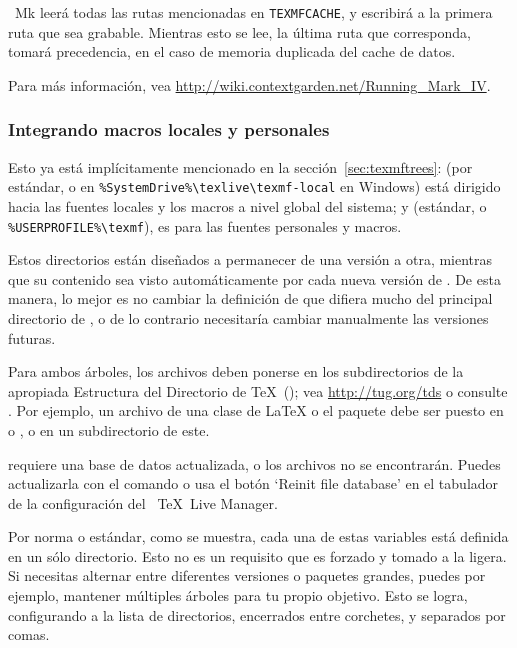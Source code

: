 \documentclass{article}
\begin{document}
\ConTeXt\ Mk leerá todas las rutas mencionadas en
\verb+TEXMFCACHE+, y escribirá a la primera ruta que sea grabable.
Mientras esto se lee, la última ruta que corresponda, tomará precedencia,
en el caso de memoria duplicada del cache de datos. 

Para más información, vea 
\url{http://wiki.contextgarden.net/Running_Mark_IV}.

\subsubsection{Integrando macros locales y personales}
\label{sec:local-personal-macros}

Esto ya está implícitamente mencionado en la
sección~\ref{sec:texmftrees}: 
 (por estándar,
 o en
\verb|%SystemDrive%\texlive\texmf-local| en Windows)
está dirigido hacia las fuentes locales y los macros a nivel global
del sistema; y  (estándar,  o
\verb|%USERPROFILE%\texmf|), es para las fuentes personales y macros.

Estos directorios están diseñados a permanecer de una versión a otra,
mientras que su contenido sea visto automáticamente por cada nueva
versión de \TL{}. De esta manera, lo mejor es no cambiar la definición
de  que difiera mucho del principal directorio de
\TL{}, o de lo contrario necesitaría cambiar manualmente las versiones
futuras. 


Para ambos árboles, los archivos deben ponerse en los subdirectorios
de la apropiada Estructura del Directorio de \TeX\ (\TDS); vea
\url{http://tug.org/tds} o consulte
. Por ejemplo, un archivo de una
clase de \LaTeX{}
o 
el paquete debe ser puesto en  o
, o en un subdirectorio de este.

 requiere una base de datos actualizada, o los
archivos no se encontrarán. Puedes actualizarla con el comando
 o usa el botón `Reinit file database' en el
tabulador de la configuración del \GUI\ \TeX\ Live Manager. 

Por norma o estándar, como se muestra, cada una de estas variables está
definida en un sólo directorio. Esto no es
un requisito que es forzado y tomado a la ligera. Si necesitas alternar entre
diferentes versiones o paquetes grandes, puedes por ejemplo, 
mantener múltiples árboles para tu propio
objetivo. Esto se logra, configurando  a la lista de directorios, 
encerrados entre corchetes, y separados por comas.
\end{document}
